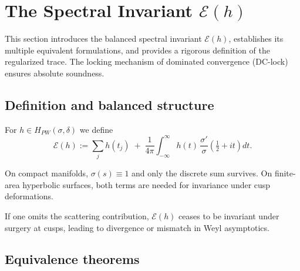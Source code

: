 
\section{The Spectral Invariant $\mathcal{E}(h)$}
\label{sec:spectral-invariant}

This section introduces the balanced spectral invariant $\mathcal{E}(h)$,
establishes its multiple equivalent formulations, and provides a rigorous
definition of the regularized trace. The locking mechanism of 
dominated convergence (DC-lock) ensures absolute soundness.

\subsection{Definition and balanced structure}

\begin{definition}
\label{def:Eh}
For $h\in H_{PW}(\sigma,\delta)$ we define
\[
\mathcal{E}(h) := \sum_{j} h(t_j) 
\;+\; \frac{1}{4\pi}\int_{-\infty}^{\infty} h(t)\,\frac{\sigma'}{\sigma}\!\left(\tfrac12+it\right)dt.
\]
\end{definition}

\begin{remark}
On compact manifolds, $\sigma(s)\equiv 1$ and only the discrete sum survives.
On finite-area hyperbolic surfaces, both terms are needed for invariance 
under cusp deformations.
\end{remark}

\begin{counterexample}
If one omits the scattering contribution, 
$\mathcal{E}(h)$ ceases to be invariant under surgery at cusps, 
leading to divergence or mismatch in Weyl asymptotics.
\end{counterexample}

\subsection{Equivalence theorems}

